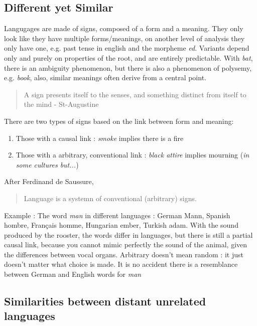 \documentclass{cours}
\begin{document}
\subsection{Different yet Similar}
Langugages are made of signs, composed of a form and a meaning. They only look like they have multiple forms/meanings, on another level of analysis they only have one, e.g. past tense in english and the morpheme \textsl{ed}. Variants depend only and purely on properties of the root, and are entirely predictable. With \textsl{bat}, there is an ambiguity phenomenon, but there is also a phenomenon of polysemy, e.g. \textsl{book}, also, similar meanings often derive from a central point.
\begin{quote}
    A sign presents itself to the senses, and something distinct from itself to the mind  - St-Augustine
\end{quote}
There are two types of signs based on the link between form and meaning\!: 
\begin{enumerate}
    \item Those with a causal link\! : \textsl{smoke} implies there is a fire
    \item Those with a arbitrary, conventional link\! : \textsl{black attire} implies mourning (\textit{in some cultures but...})
\end{enumerate}
After Ferdinand de Saussure, \begin{quote}
    Language is a systemn of conventional (arbitrary) signs.    
\end{quote}
Example\! : The word \textsl{man} in different languages\! : German Mann, Spanish hombre, Français homme, Hungarian ember, Turkish adam. With the sound produced by the rooster, the words differ in languages, but there is still a partial causal link, because you cannot mimic perfectly the sound of the animal, given the differences between vocal organs. 
Arbitrary doesn't mean random\! : it just doesn't matter what choice is made. It is no accident there is a resemblance between German and English words for \textsl{man}

\subsection{Similarities between distant unrelated languages}
\end{document}
